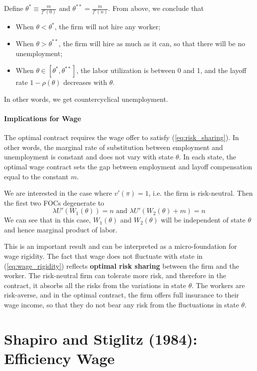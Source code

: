 \documentclass[12pt]{article}
\begin{document}
Define $\theta^* \equiv \frac{m}{f'(0)}$ and $\theta^{**} = \frac{m}{f'(n)}$. From above, we conclude that
\begin{itemize}
	\item When $\theta < \theta^*$, the firm will not hire any worker;
	\item When $\theta > \theta^{**}$, the firm will hire as much as it can, so that there will be no unemployment;
	\item When $\theta \in [\theta^*, \theta^{**}]$, the labor utilization is between 0 and 1, and the layoff rate $1-\rho(\theta)$ decreases with $\theta$.
\end{itemize}
In other words, we get countercyclical unemployment.

\paragraph{Implications for Wage \\ [6pt]}

The optimal contract requires the wage offer to satisfy (\ref{eq:risk_sharing}). In other words, the marginal rate of substitution between employment and unemployment is constant and does not vary with state $\theta$. In each state, the optimal wage contract sets the gap between employment and layoff compensation equal to the constant $m$.

We are interested in the case where $v'(\pi) = 1$, i.e. the firm is risk-neutral. Then the first two FOCs degenerate to
\begin{equation} \label{eq:wage_rigidity}
	\lambda U'(W_1(\theta)) = n \text{ and } \lambda U'(W_2(\theta) + m) = n
\end{equation}
We can see that in this case, $W_1(\theta)$ and $W_2(\theta)$ will be independent of state $\theta$ and hence marginal product of labor. 

This is an important result and can be interpreted as a micro-foundation for wage rigidity. The fact that wage does not fluctuate with state in (\ref{eq:wage_rigidity}) reflects \textbf{optimal risk sharing} between the firm and the worker. The risk-neutral firm can tolerate more risk, and therefore in the contract, it absorbs all the risks from the variations in state $\theta$. The workers are risk-averse, and in the optimal contract, the firm offers full insurance to their wage income, so that they do not bear any risk from the fluctuations in state $\theta$. 

\section{Shapiro and Stiglitz (1984): Efficiency Wage}
\end{document}
